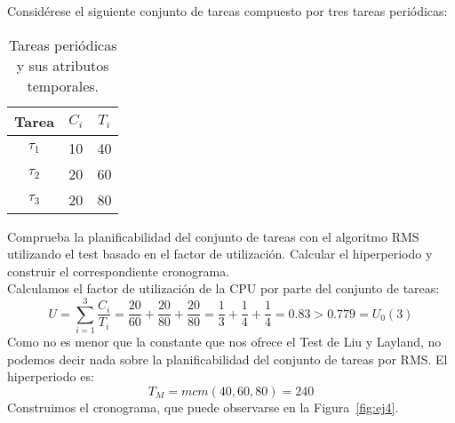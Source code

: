\begin{ejercicio}\label{ej:rel4_4}
    Considérese el siguiente conjunto de tareas compuesto por tres tareas periódicas:
    \begin{table}[H]
    \centering
    \begin{tabular}{|c|c|c|}
        \hline
        Tarea & $C_i$ & $T_i$ \\
        \hline
        $\tau_1$ & 10 & 40 \\
        \hline
        $\tau_2$ & 20 & 60 \\
        \hline
        $\tau_3$ & 20 & 80 \\
        \hline
    \end{tabular}
    \caption{Tareas periódicas y sus atributos temporales.}
    \label{tab:4_4}
    \end{table}
    Comprueba la planificabilidad del conjunto de tareas con el algoritmo RMS utilizando el test basado en el factor de utilización. Calcular el hiperperiodo y construir el correspondiente cronograma.\\

    Calculamos el factor de utilización de la CPU por parte del conjunto de tareas:
    \begin{equation*}
        U = \sum_{i=1}^{3}\dfrac{C_i}{T_i} = \dfrac{20}{60} + \dfrac{20}{80} + \dfrac{20}{80} = \dfrac{1}{3} + \dfrac{1}{4} + \dfrac{1}{4} = 0.83 > 0.779 = U_0(3)
    \end{equation*}
    Como no es menor que la constante que nos ofrece el Test de Liu y Layland, no podemos decir nada sobre la planificabilidad del conjunto de tareas por RMS\@. El hiperperiodo es:
    \begin{equation*}
        T_M = mcm(40,60,80) = 240
    \end{equation*}
    Construimos el cronograma, que puede observarse en la Figura~\ref{fig:ej4}.
    \begin{figure}[H]
        \centering
\end{figure}
\end{ejercicio}
